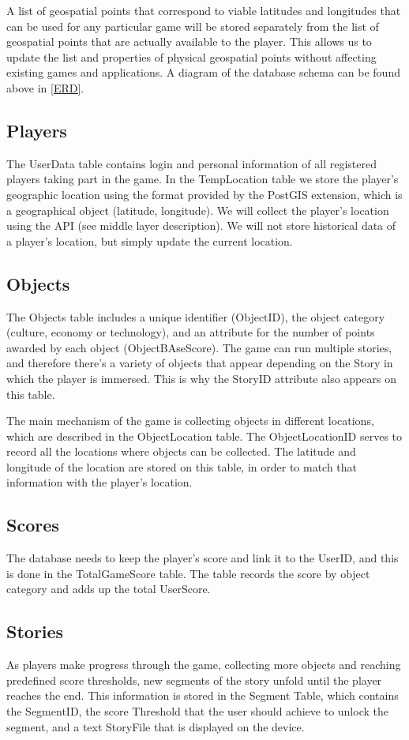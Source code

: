 \documentclass[conference]{IEEEtran}
\begin{document}
A list of geospatial points that correspond to viable latitudes and longitudes that can be used for any particular game will be stored separately from the list of geospatial points that are actually available to the player. This allows us to update the list and properties of physical geospatial points without affecting existing games and applications. A diagram of the database schema can be found above in \autoref{ERD}. 

\subsection{Players}
The UserData table contains login and personal information of all registered players taking part in the game. In the TempLocation table we store the player’s geographic location using the format provided by the PostGIS extension, which is a geographical object (latitude, longitude). We will collect the player's location using the API (see middle layer description). We will not store historical data of a player’s location, but simply update the current location.

 \subsection{Objects}
The Objects table includes a unique identifier (ObjectID), the object category (culture, economy or technology), and an attribute for the number of points awarded by each object (ObjectBAseScore). The game can run multiple stories, and therefore there’s a variety of objects that appear depending on the Story in which the player is immersed. This is why the StoryID attribute also appears on this table. 

The main mechanism of the game is collecting objects in different locations, which are described in the ObjectLocation table. The ObjectLocationID serves to record all the locations where objects can be collected. The latitude and longitude of the location are stored on this table, in order to match that information with the player’s location.

\subsection{Scores} 
The database needs to keep the player’s score and link it to the UserID, and this is done in the TotalGameScore table. The table records the score by object category and adds up the total UserScore. 

\subsection{Stories}
As players make progress through the game, collecting more objects and reaching predefined score thresholds, new segments of the story unfold until the player reaches the end. This information is stored in the Segment Table, which contains the SegmentID, the score Threshold that the user should achieve to unlock the segment, and a text StoryFile that is displayed on the device. 
\end{document}

